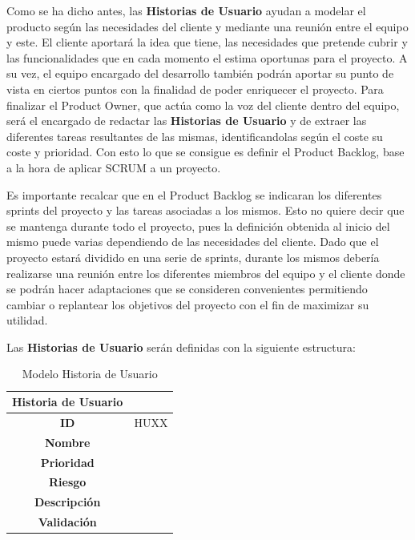 Como se ha dicho antes, las \textbf{Historias de Usuario} ayudan a modelar el producto según las necesidades del cliente y mediante una reunión entre el equipo y este. El cliente aportará la idea que tiene, las necesidades que pretende cubrir y las funcionalidades que en cada momento el estima oportunas para el proyecto. A su vez, el equipo encargado del desarrollo también podrán aportar su punto de vista en ciertos puntos con la finalidad de poder enriquecer el proyecto. Para finalizar el Product Owner, que actúa como la voz del cliente dentro del equipo, será el encargado de redactar las \textbf{Historias de Usuario} y de extraer las diferentes tareas resultantes de las mismas, identificandolas según el coste su coste y prioridad. Con esto lo que se consigue es definir el Product Backlog, base a la hora de aplicar SCRUM a un proyecto.

Es importante recalcar que en el Product Backlog se indicaran los diferentes sprints del proyecto y las tareas asociadas a los mismos. Esto no quiere decir que se mantenga durante todo el proyecto, pues la definición obtenida al inicio del mismo puede varias dependiendo de las necesidades del cliente. Dado que el proyecto estará dividido en una serie de sprints, durante los mismos debería realizarse una reunión entre los diferentes miembros del equipo y el cliente donde se podrán hacer adaptaciones que se consideren convenientes permitiendo cambiar o replantear los objetivos del proyecto con el fin de maximizar su utilidad.

Las \textbf{Historias de Usuario} serán definidas con la siguiente estructura:

\begin{table}[H]
	\begin{center}
		\begin{tabular}{| c | p{9cm} |}
			\hline
			
			Historia de Usuario &  \\ \hline
			
			
			\textbf{ID} & HUXX \\
			\textbf{Nombre} &  \\
			\textbf{Prioridad} &  \\
			\textbf{Riesgo} &  \\
			\textbf{Descripción} &  \\
			\textbf{Validación} &  \\ \hline
		\end{tabular}
		\caption{Modelo Historia de Usuario}
	\end{center}
\end{table}

